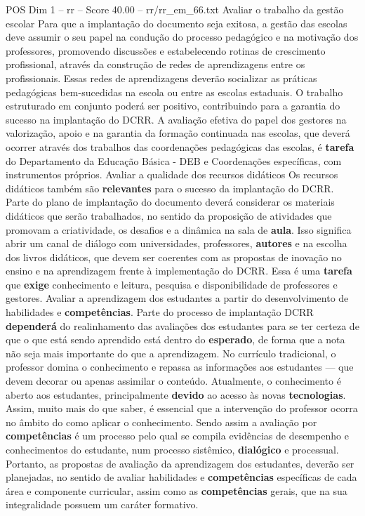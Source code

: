\begin{textsample}{POS Dim 1 – rr – Score 40.00 – rr/rr\_em\_66.txt}
Avaliar o trabalho da gestão escolar Para que a implantação do documento seja exitosa, a gestão das escolas deve assumir o seu papel na condução do processo pedagógico e na motivação dos professores, promovendo discussões e estabelecendo rotinas de crescimento profissional, através da construção de redes de aprendizagens entre os profissionais.
Essas redes de aprendizagens deverão socializar as práticas pedagógicas bem-sucedidas na escola ou entre as escolas estaduais.
O trabalho estruturado em conjunto poderá ser positivo, contribuindo para a garantia do sucesso na implantação do DCRR.
A avaliação efetiva do papel dos gestores na valorização, apoio e na garantia da formação continuada nas escolas, que deverá ocorrer através dos trabalhos das coordenações pedagógicas das escolas, é \textbf{tarefa} do Departamento da Educação Básica - DEB e Coordenações específicas, com instrumentos próprios.
Avaliar a qualidade dos recursos didáticos Os recursos didáticos também são \textbf{relevantes} para o sucesso da implantação do DCRR.
Parte do plano de implantação do documento deverá considerar os materiais didáticos que serão trabalhados, no sentido da proposição de atividades que promovam a criatividade, os desafios e a dinâmica na sala de \textbf{aula}.
Isso significa abrir um canal de diálogo com universidades, professores, \textbf{autores} e na escolha dos livros didáticos, que devem ser coerentes com as propostas de inovação no ensino e na aprendizagem frente à implementação do DCRR.
Essa é uma \textbf{tarefa} que \textbf{exige} conhecimento e leitura, pesquisa e disponibilidade de professores e gestores.
Avaliar a aprendizagem dos estudantes a partir do desenvolvimento de habilidades e \textbf{competências}.
Parte do processo de implantação DCRR \textbf{dependerá} do realinhamento das avaliações dos estudantes para se ter certeza de que o que está sendo aprendido está dentro do \textbf{esperado}, de forma que a nota não seja mais importante do que a aprendizagem.
No currículo tradicional, o professor domina o conhecimento e repassa as informações aos estudantes — que devem decorar ou apenas assimilar o conteúdo.
Atualmente, o conhecimento é aberto aos estudantes, principalmente \textbf{devido} ao acesso às novas \textbf{tecnologias}.
Assim, muito mais do que saber, é essencial que a intervenção do professor ocorra no âmbito do como aplicar o conhecimento.
Sendo assim a avaliação por \textbf{competências} é um processo pelo qual se compila evidências de desempenho e conhecimentos do estudante, num processo sistêmico, \textbf{dialógico} e processual.
Portanto, as propostas de avaliação da aprendizagem dos estudantes, deverão ser planejadas, no sentido de avaliar habilidades e \textbf{competências} específicas de cada área e componente curricular, assim como as \textbf{competências} gerais, que na sua integralidade possuem um caráter formativo.

\end{textsample}
